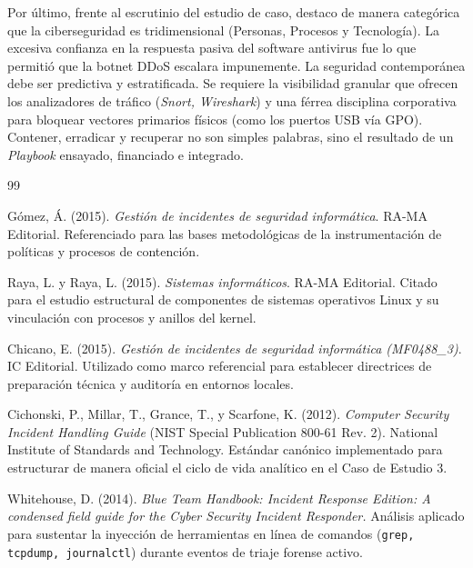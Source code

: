 \documentclass[12pt,a4paper]{article}
\begin{document}
Por último, frente al escrutinio del estudio de caso, destaco de manera categórica que la ciberseguridad es tridimensional (Personas, Procesos y Tecnología). La excesiva confianza en la respuesta pasiva del software antivirus fue lo que permitió que la botnet DDoS escalara impunemente. La seguridad contemporánea debe ser predictiva y estratificada. Se requiere la visibilidad granular que ofrecen los analizadores de tráfico (\textit{Snort, Wireshark}) y una férrea disciplina corporativa para bloquear vectores primarios físicos (como los puertos USB vía GPO). Contener, erradicar y recuperar no son simples palabras, sino el resultado de un \textit{Playbook} ensayado, financiado e integrado.

\newpage

\renewcommand\refname{Referencias Bibliográficas y Técnicas}
\begin{thebibliography}{99}

Gómez, Á. (2015). \textit{Gestión de incidentes de seguridad informática}. RA-MA Editorial. Referenciado para las bases metodológicas de la instrumentación de políticas y procesos de contención.

Raya, L. y Raya, L. (2015). \textit{Sistemas informáticos}. RA-MA Editorial. Citado para el estudio estructural de componentes de sistemas operativos Linux y su vinculación con procesos y anillos del kernel.

Chicano, E. (2015). \textit{Gestión de incidentes de seguridad informática (MF0488\_3)}. IC Editorial. Utilizado como marco referencial para establecer directrices de preparación técnica y auditoría en entornos locales.

Cichonski, P., Millar, T., Grance, T., y Scarfone, K. (2012). \textit{Computer Security Incident Handling Guide} (NIST Special Publication 800-61 Rev. 2). National Institute of Standards and Technology. Estándar canónico implementado para estructurar de manera oficial el ciclo de vida analítico en el Caso de Estudio 3.

Whitehouse, D. (2014). \textit{Blue Team Handbook: Incident Response Edition: A condensed field guide for the Cyber Security Incident Responder.} Análisis aplicado para sustentar la inyección de herramientas en línea de comandos (\texttt{grep, tcpdump, journalctl}) durante eventos de triaje forense activo.

\end{thebibliography}
\end{document}
